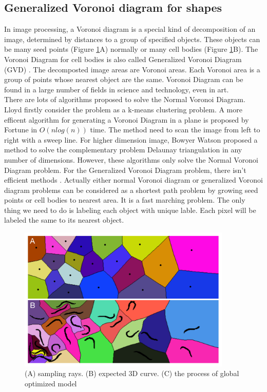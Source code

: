 \subsection{Generalized Voronoi diagram for shapes} \label{subsec:gvd}
In image processing, a Voronoi diagram \cite{aurenhammer1991Voronoi} is a special kind of decomposition of an image, determined by distances to a group of specified objects. These objects can be many seed points (Figure \ref{fig:fm-Voronoi}A) normally or many cell bodies (Figure \ref{fig:fm-Voronoi}B). The Voronoi Diagram for cell bodies is also called Generalized Voronoi Diagram (GVD) \cite{nath2007accurate}. The decomposted image areas are Voronoi areas. Each Voronoi area is a group of points whose nearest object are the same. Voronoi Diagram can be found in a large number of fields in science and technology, even in art.\\
There are lots of algorithms proposed to solve the Normal Voronoi Diagram. Lloyd \cite{lloyd1977triangulations} firstly consider the problem as a k-means clustering problem. A more efficent algorithm for generating a Voronoi Diagram in a plane is proposed by Fortune \cite{fortune1987sweepline} in $O(nlog(n))$ time. The method need to scan the image from left to right with a sweep line. For higher dimension image, Bowyer Watson \cite{rebay1993efficient} proposed a method to solve the complementary problem Delaunay triangulation in any number of dimensions. However, these algorithms only solve the Normal Voronoi Diagram problem. For the Generalized Voronoi Diagram problem, there isn't efficient methods \cite{hoff1999fast, takahashi1989motion, nath2007accurate}. Actually either normal Voronoi diagram or generalized Voronoi diagram problems can be considered as a shortest path problem by growing seed points or cell bodies to nearest area. It is a fast marching problem. The only thing we need to do is labeling each object with unique lable. Each pixel will be labeled the same to its nearest object.

\begin{figure}[htb]
\begin{center}
\includegraphics[width=4in]{images/fm_voronoi}
\caption[Normal Voronoi diagram and generalized Voronoi diagram]{(A) sampling rays. (B) expected 3D curve. (C) the process of global optimized model}
\label{fig:fm-Voronoi}
\end{center}
\end{figure}
